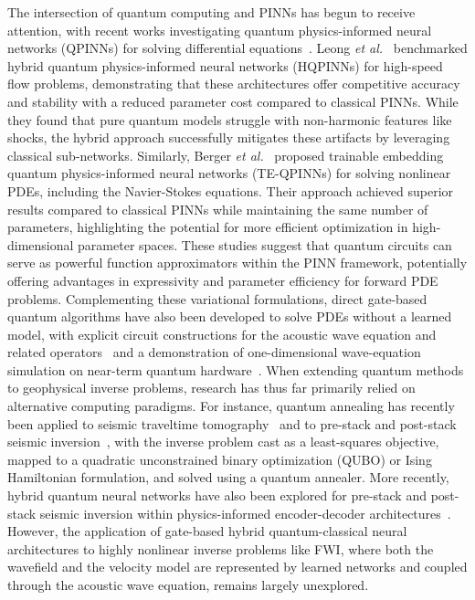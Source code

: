 The intersection of quantum computing and PINNs has begun to receive attention, with recent works investigating quantum physics-informed neural networks (QPINNs) for solving differential equations~\cite{https://doi.org/10.1002/qute.202300065}. Leong \emph{et al.}~\cite{LEONG2025106782} benchmarked hybrid quantum physics-informed neural networks (HQPINNs) for high-speed flow problems, demonstrating that these architectures offer competitive accuracy and stability with a reduced parameter cost compared to classical PINNs. While they found that pure quantum models struggle with non-harmonic features like shocks, the hybrid approach successfully mitigates these artifacts by leveraging classical sub-networks. Similarly, Berger \emph{et al.}~\cite{Berger2025} proposed trainable embedding quantum physics-informed neural networks (TE-QPINNs) for solving nonlinear PDEs, including the Navier-Stokes equations. Their approach achieved superior results compared to classical PINNs while maintaining the same number of parameters, highlighting the potential for more efficient optimization in high-dimensional parameter spaces. These studies suggest that quantum circuits can serve as powerful function approximators within the PINN framework, potentially offering advantages in expressivity and parameter efficiency for forward PDE problems. Complementing these variational formulations, direct gate-based quantum algorithms have also been developed to solve PDEs without a learned model, with explicit circuit constructions for the acoustic wave equation and related operators~\cite{tbzc-w9x8} and a demonstration of one-dimensional wave-equation simulation on near-term quantum hardware~\cite{PhysRevResearch.6.043169}. When extending quantum methods to geophysical inverse problems, research has thus far primarily relied on alternative computing paradigms. For instance, quantum annealing has recently been applied to seismic traveltime tomography~\cite{Nguyen2025} and to pre-stack and post-stack seismic inversion~\cite{Vashisth2025GEO}, with the inverse problem cast as a least-squares objective, mapped to a quadratic unconstrained binary optimization (QUBO) or Ising Hamiltonian formulation, and solved using a quantum annealer. More recently, hybrid quantum neural networks have also been explored for pre-stack and post-stack seismic inversion within physics-informed encoder-decoder architectures~\cite{Vashisth2025HQNN}. However, the application of gate-based hybrid quantum-classical neural architectures to highly nonlinear inverse problems like FWI, where both the wavefield and the velocity model are represented by learned networks and coupled through the acoustic wave equation, remains largely unexplored.

